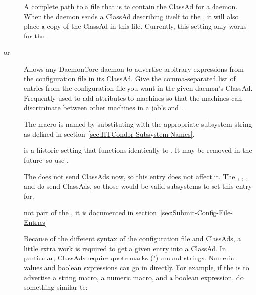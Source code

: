 \begin{description}
\label{param:SubsysDaemonAdFile}
\item[\MacroB{<SUBSYS>\_DAEMON\_AD\_FILE}]
  A complete path to a file that is to contain the ClassAd for a daemon.
  When the daemon sends a ClassAd describing itself to the
  , it will also place a copy of the ClassAd in this
  file. Currently, this setting only works for the .

\label{param:SubsysExprs}
\label{param:SubsysAttrs}
\item[\MacroB{<SUBSYS>\_ATTRS} or
\MacroB{<SUBSYS>\_EXPRS}]
  Allows any DaemonCore daemon to advertise arbitrary
  expressions from the configuration file in its ClassAd.  Give the
  comma-separated list of entries from the configuration file you want in the
  given daemon's ClassAd.
  Frequently used to add attributes to machines so that the
  machines can discriminate between other machines in a job's 
   and .

  The macro is named by substituting 
  with the appropriate subsystem string as defined in
  section~\ref{sec:HTCondor-Subsystem-Names}.

   is a historic setting that functions identically to
  . It may be removed in the future, so use .

  \Note The  does not send
  ClassAds now, so this entry does not affect it.  The
  , , , and
   do send ClassAds, so those would be valid
  subsystems to set this entry for.
  
   not part of the , it is
  documented in section~\ref{sec:Submit-Config-File-Entries}

  Because of the different syntax of the configuration
  file and ClassAds, a little extra work is required to get a
  given entry into a ClassAd.  In particular, ClassAds require quote
  marks (") around strings.  Numeric values and boolean expressions
  can go in directly.  
  For example, if the  is to advertise a string macro, a numeric
  macro, and a boolean expression, do something similar to:


\end{description}
